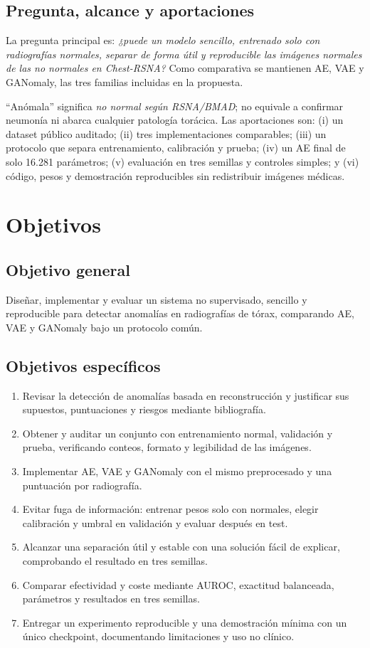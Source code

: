 \documentclass[10pt,a4paper,twocolumn]{article}
\begin{document}
\subsection{Pregunta, alcance y aportaciones}

La pregunta principal es: \emph{¿puede un modelo sencillo, entrenado solo con
radiografías normales, separar de forma útil y reproducible las imágenes
normales de las no normales en Chest-RSNA?} Como comparativa se mantienen AE,
VAE y GANomaly, las tres familias incluidas en la propuesta.

``Anómala'' significa \emph{no normal según RSNA/BMAD}; no equivale a confirmar
neumonía ni abarca cualquier patología torácica. Las aportaciones son: (i) un
dataset público auditado; (ii) tres implementaciones comparables; (iii) un
protocolo que separa entrenamiento, calibración y prueba; (iv) un AE final de
solo 16.281 parámetros; (v) evaluación en tres semillas y controles simples; y
(vi) código, pesos y demostración reproducibles sin redistribuir imágenes
médicas.

\section{Objetivos}

\subsection{Objetivo general}

Diseñar, implementar y evaluar un sistema no supervisado, sencillo y
reproducible para detectar anomalías en radiografías de tórax, comparando AE,
VAE y GANomaly bajo un protocolo común.

\subsection{Objetivos específicos}

\begin{enumerate}
  \item Revisar la detección de anomalías basada en reconstrucción y justificar
  sus supuestos, puntuaciones y riesgos mediante bibliografía.
  \item Obtener y auditar un conjunto con entrenamiento normal, validación y
  prueba, verificando conteos, formato y legibilidad de las imágenes.
  \item Implementar AE, VAE y GANomaly con el mismo preprocesado y una
  puntuación por radiografía.
  \item Evitar fuga de información: entrenar pesos solo con normales, elegir
  calibración y umbral en validación y evaluar después en test.
  \item Alcanzar una separación útil y estable con una solución fácil de
  explicar, comprobando el resultado en tres semillas.
  \item Comparar efectividad y coste mediante AUROC, exactitud balanceada,
  parámetros y resultados en tres semillas.
  \item Entregar un experimento reproducible y una demostración mínima con un
  único checkpoint, documentando limitaciones y uso no clínico.
\end{enumerate}
\end{document}
